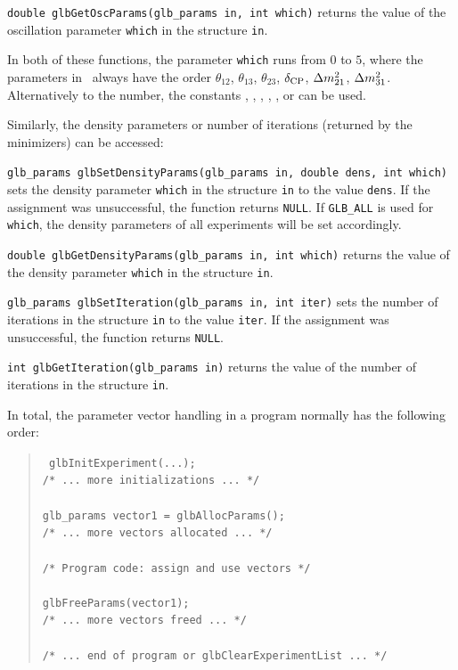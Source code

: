 \begin{function}
{\tt double glbGetOscParams(glb\_params in, int which)}
returns the value of the oscillation parameter {\tt which} in the 
structure {\tt in}.
\end{function}
In both of these functions, the parameter {\tt which} runs from
$0$ to $5$, where the parameters in \GLOBES\ always have the order $\theta_{12}$, $\theta_{13}$, $\theta_{23}$, $\delta_{\mathrm{CP}}$, $\Delta m_{21}^2$, $\Delta m_{31}^2$.
Alternatively to the number, the constants , , , , 
, or  can be used.

Similarly, the density parameters or number of iterations 
(returned by the minimizers) can be accessed:
\begin{function}
{\tt glb\_params glbSetDensityParams(glb\_params in, double dens, int which)} sets the density parameter {\tt which} in the structure {\tt in}
to the value {\tt dens}. If the assignment was unsuccessful, the 
function returns {\tt NULL}. If {\tt GLB\_ALL} is used for {\tt which},
the density parameters of all experiments will be set accordingly.
\end{function}
\begin{function}
{\tt double glbGetDensityParams(glb\_params in, int which)}
returns the value of the density parameter {\tt which} in the 
structure {\tt in}.
\end{function} 
\begin{function}
 
{\tt glb\_params glbSetIteration(glb\_params in, int iter)} sets the number of iterations in the structure {\tt in}
to the value {\tt iter}. If the assignment was unsuccessful, the 
function returns {\tt NULL}.
\end{function}
\begin{function}
{\tt int glbGetIteration(glb\_params in)}
returns the value of the number of iterations in the 
structure {\tt in}.
\end{function}
In total, the parameter vector handling in a program normally has the
following order:
\begin{quote}
{\tt
glbInitExperiment(...); \\
/* ... more initializations ... */ \\
\\
glb\_params vector1 = glbAllocParams(); \\
/* ... more vectors allocated ... */ \\
\\
/* Program code: assign and use vectors */ \\
\\
glbFreeParams(vector1); \\
/* ... more vectors freed ... */ \\
\\
/* ... end of program or glbClearExperimentList ... */ 
}
\end{quote}

